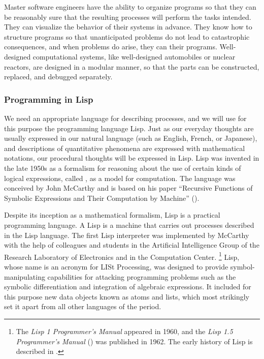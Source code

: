 Master software engineers have the ability to organize programs so that they can be reasonably sure that the resulting processes will perform the tasks intended.
They can visualize the behavior of their systems in advance.
They know how to structure programs so that unanticipated problems do not lead to catastrophic consequences, and when problems do arise, they can  their programs.
Well-designed computational systems, like well-designed automobiles or nuclear reactors, are designed in a modular manner, so that the parts can be constructed, replaced, and debugged separately.

\subsubsection*{Programming in Lisp}

We need an appropriate language for describing processes, and we will use for this purpose the programming language Lisp.
Just as our everyday thoughts are usually expressed in our natural language (such as English, French, or Japanese), and descriptions of quantitative phenomena are expressed with mathematical notations, our procedural thoughts will be expressed in Lisp.
Lisp was invented in the late 1950s as a formalism for reasoning about the use of certain kinds of logical expressions, called , as a model for computation.
The language was conceived by John McCarthy and is based on his paper “Recursive Functions of Symbolic Expressions and Their Computation by Machine” ().

Despite its inception as a mathematical formalism, Lisp is a practical programming language.
A Lisp  is a machine that carries out processes described in the Lisp language.
The first Lisp interpreter was implemented by McCarthy with the help of colleagues and students in the Artificial Intelligence Group of the  Research Laboratory of Electronics and in the  Computation Center.%
\footnote{
	The \textit{Lisp 1 Programmer’s Manual} appeared in 1960, and the \textit{Lisp 1.5
Programmer’s Manual} () was published in 1962.
	The early history of Lisp is described in .
}
Lisp, whose name is an acronym for LISt Processing, was designed to provide symbol-manipulating capabilities for attacking programming problems such as the symbolic differentiation and integration of algebraic expressions.
It included for this purpose new data objects known as atoms and lists, which most strikingly set it apart from all other languages of the period.

